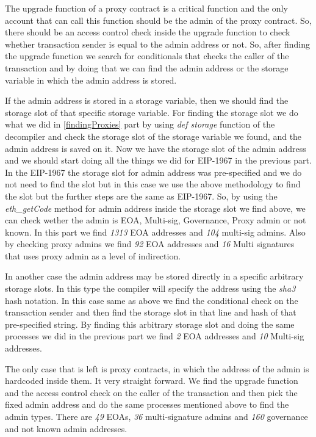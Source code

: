The upgrade function of a proxy contract is a critical function and the only account that can call this function should be the admin of the proxy contract. So, there should be an access control check inside the upgrade function to check whether transaction sender is equal to the admin address or not.
So, after finding the upgrade function we search for conditionals that checks the caller of the transaction and by doing that we can find the admin address or the storage variable in which the admin address is stored.


If the admin address is stored in a storage variable, then we should find the storage slot of that specific storage variable. For finding the storage slot we do what we did in \ref{findingProxies} part by using \textit{def storage} function of the decompiler and check the storage slot of the storage variable we found, and the admin address is saved on it. 
Now we have the storage slot of the admin address and we should start doing all the things we did for EIP-1967 in the previous part. 
In the EIP-1967 the storage slot for admin address was pre-specified and we do not need to find the slot but in this case we use the above methodology to find the slot but the further steps are the same as EIP-1967.
So, by using the \textit{eth\_getCode} method for admin address inside the storage slot we find above, we can check wether the admin is EOA, Multi-sig, Governance, Proxy admin or not known.
In this part we find \textit{1313} EOA addresses and \textit{104} multi-sig admins. Also by checking proxy admins we find \textit{92} EOA addresses and \textit{16} Multi signatures that uses proxy admin as a level of indirection. 

In another case the admin address may be stored directly in a specific arbitrary storage slots. In this type the compiler will specify the address using the \textit{sha3} hash notation. In this case same as above we find the conditional check on the transaction sender and then find the storage slot in that line and hash of that pre-specified string. 
By finding this arbitrary storage slot and doing the same processes we did in the previous part we find \textit{2} EOA addresses and \textit{10} Multi-sig addresses.

The only case that is left is proxy contracts, in which the address of the admin is hardcoded inside them. It very straight forward. We find the upgrade function and the access control check on the caller of the transaction and then pick the fixed admin address and do the same processes mentioned above to find the admin types. There are \textit{49} EOAs, \textit{36} multi-signature admins and \textit{160} governance and not known admin addresses. 

